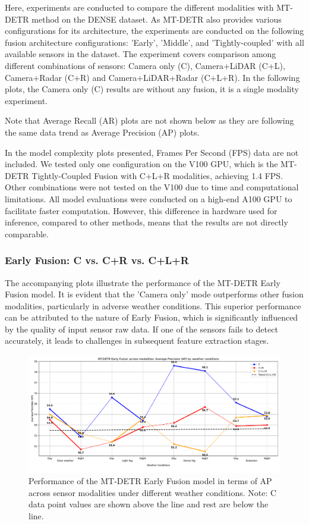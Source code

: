 \documentclass[report.tex]{subfiles}
\begin{document}
    Here, experiments are conducted to compare the different modalities with MT-DETR method on the DENSE dataset. As MT-DETR also provides various configurations for its architecture, the experiments are conducted on the following fusion architecture configurations: 'Early', 'Middle', and 'Tightly-coupled' with all available sensors in the dataset. The experiment covers comparison among different combinations of sensors: Camera only (C), Camera+LiDAR (C+L), Camera+Radar (C+R) and Camera+LiDAR+Radar (C+L+R). In the following plots, the Camera only (C) results are without any fusion, it is a single modality experiment.

    Note that Average Recall (AR) plots are not shown below as they are following the same data trend as Average Precision (AP) plots. 

    In the model complexity plots presented, Frames Per Second (FPS) data are not included. We tested only one configuration on the V100 GPU, which is the MT-DETR Tightly-Coupled Fusion with C+L+R modalities, achieving 1.4 FPS. Other combinations were not tested on the V100 due to time and computational limitations. All model evaluations were conducted on a high-end A100 GPU to facilitate faster computation. However, this difference in hardware used for inference, compared to other methods, means that the results are not directly comparable.

    \FloatBarrier
    \subsubsection{Early Fusion: C vs. C+R vs. C+L+R}

    The accompanying plots illustrate the performance of the MT-DETR Early Fusion model. It is evident that the 'Camera only' mode outperforms other fusion modalities, particularly in adverse weather conditions. This superior performance can be attributed to the nature of Early Fusion, which is significantly influenced by the quality of input sensor raw data. If one of the sensors fails to detect accurately, it leads to challenges in subsequent feature extraction stages.

        \begin{figure}[]
            \centering
            \includegraphics[width=1.0\textwidth]{images/results/mtdetr/early/ap.pdf}
            \caption{Performance of the MT-DETR Early Fusion model in terms of AP across sensor modalities under different weather conditions. Note: C data point values are shown above the line and rest are below the line.}
            \label{fig:mtdetr_early_ap}
        \end{figure}
\end{document}
